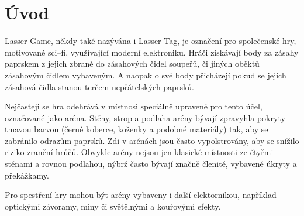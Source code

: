 \chapter*{Úvod}
{}

Lasser Game, někdy také nazývána i Lasser Tag, je označení pro společenské hry, motivované sci--fi, využívající moderní elektroniku. Hráči získávají body za zásahy  paprskem z jejich zbraně do zásahových čidel soupeřů, či jiných oběktů zásahovým čidlem vybaveným. A naopak o své body přicházejí pokud se jejich zásahová čidla stanou terčem nepřátelských  paprsků.

Nejčasteji se hra odehrává v místnosi speciálně upravené pro tento účel, označované jako aréna. Stěny, strop a podlaha arény bývají zpravyhla pokryty tmavou barvou (černé koberce, koženky a podobné materiály) tak, aby se zabránilo odrazům  paprsků. Zdi v arénách jsou často vypolstrovány, aby se snížilo riziko zranění hrůčů. Obvykle arény nejsou jen klasické místnosti ze čtyřmi stěnami a rovnou podlahou, nýbrž často bývají značně členité, vybavené úkryty a překážkamy.

Pro spestření hry mohou být arény vybaveny i další elektornikou, například optickými závoramy, miny či světělnými a kouřovými efekty.
